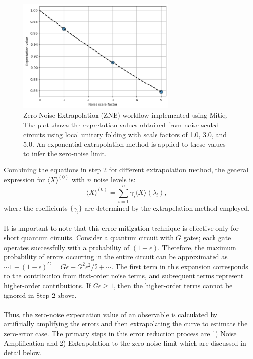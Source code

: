 \documentclass[12pt]{article}
\begin{document}
\begin{figure}[h!]
    \centering
    \includegraphics[width=0.7\textwidth]{images/mitiq_plot.png}
    \caption{Zero-Noise Extrapolation (ZNE) workflow implemented using Mitiq. The plot shows the expectation values obtained from noise-scaled circuits using local unitary folding with scale factors of 1.0, 3.0, and 5.0. An exponential extrapolation method is applied to these values to infer the zero-noise limit.}
    \label{fig:zne_mitiq_workflow}
\end{figure}

Combining the equations in step 2 for different extrapolation method, the general expression for $\langle X \rangle^{(0)}$ with $n$ noise levels is:
\begin{equation}
\langle X \rangle^{(0)} = \sum_{i=1}^{n} \gamma_i \langle X \rangle(\lambda_i),
\end{equation}
where the coefficients $\{\gamma_i\}$ are determined by the extrapolation method employed. \\ \\
It is important to note that this error mitigation technique is effective only for short quantum circuits. Consider a quantum circuit with $G$ gates; each gate operates successfully with a probability of $(1-\epsilon)$. Therefore, the maximum probability of errors occurring in the entire circuit can be approximated as $ \sim 1 - (1- \epsilon)^G = G\epsilon + G^2 \epsilon^2/2 + \cdots$. The first term in this expansion corresponds to the contribution from first-order noise terms, and subsequent terms represent higher-order contributions. If $G\epsilon \geq 1$, then the higher-order terms cannot be ignored in Step 2 above. \\ \\
Thus, the zero-noise expectation value of an observable is calculated by artificially amplifying the errors and then extrapolating the curve to estimate the zero-error case. The primary steps in this error reduction process are 1) Noise Amplification and 2) Extrapolation to the zero-noise limit which are discussed in detail below.
\end{document}
